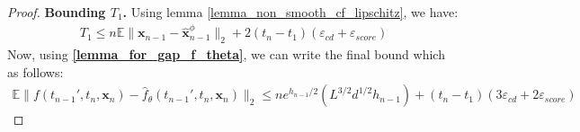 \documentclass[11pt]{article}
\def\rvx{{\mathbf{x}}}
\newcommand{\E}{\mathbb{E}}
\newtheorem{theorem}[lemma]{Theorem}
\begin{document}
\begin{proof}
\noindent
\textbf{Bounding $T_1$.} Using lemma \ref{lemma_non_smooth_cf_lipschitz}, we have:
\begin{align}
    T_1 \leq  n \mathbb{E} \|\rvx_{n-1}-\hat{\rvx}^\phi_{n-1}\|_2 + 2(t_n-t_1)\left(\varepsilon_{cd} + \varepsilon_{score} \right)
\end{align}
Now, using \textbf{\ref{lemma_for_gap_f_theta}}, we can write the final bound which as follows:
\begin{align*}
\E  
  \|
  f(t_{n-1}',t_n,{\rvx}_n)-\hat{f}_\theta(t_{n-1}',t_n,{\rvx}_n)\|_2 \leq ne^{{h_{n-1}}/{2}}(L^{{3}/{2}}d^{{1}/{2}}h_{n-1}) + (t_n-t_1)\left(3\varepsilon_{cd} +2\varepsilon_{score} \right)
\end{align*}
\end{proof}





\end{document}
